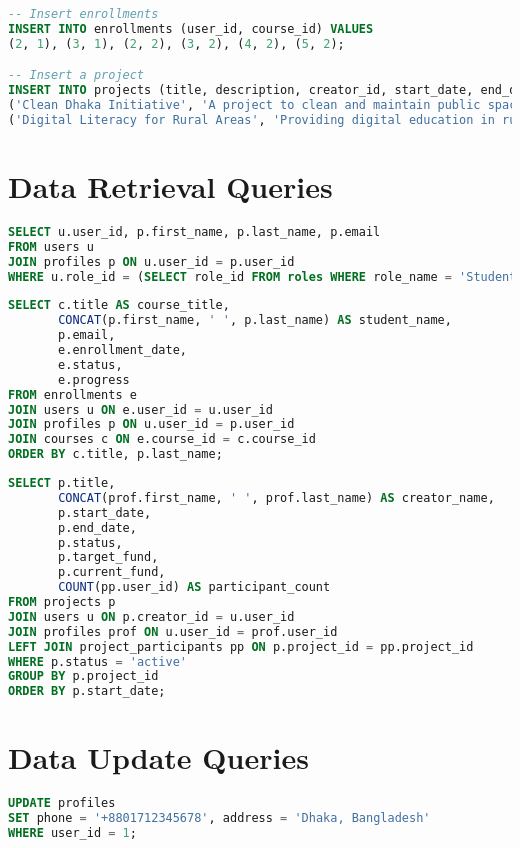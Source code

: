 \documentclass[12pt]{report}
\begin{document}
\begin{lstlisting}[language=SQL, caption=Inserting Sample Data]
-- Insert enrollments
INSERT INTO enrollments (user_id, course_id) VALUES
(2, 1), (3, 1), (2, 2), (3, 2), (4, 2), (5, 2);

-- Insert a project
INSERT INTO projects (title, description, creator_id, start_date, end_date, target_fund) VALUES
('Clean Dhaka Initiative', 'A project to clean and maintain public spaces in Dhaka', 4, '2023-11-01', '2024-06-30', 500000.00),
('Digital Literacy for Rural Areas', 'Providing digital education in rural communities', 5, '2023-12-01', '2024-08-31', 750000.00);
    \end{lstlisting}
    
    \section{Data Retrieval Queries}
    \begin{lstlisting}[language=SQL, caption=Query to Get All Students]
SELECT u.user_id, p.first_name, p.last_name, p.email
FROM users u
JOIN profiles p ON u.user_id = p.user_id
WHERE u.role_id = (SELECT role_id FROM roles WHERE role_name = 'Student');
    \end{lstlisting}
    
    \begin{lstlisting}[language=SQL, caption=Query to Get Course Enrollments]
SELECT c.title AS course_title, 
       CONCAT(p.first_name, ' ', p.last_name) AS student_name, 
       p.email, 
       e.enrollment_date, 
       e.status,
       e.progress
FROM enrollments e
JOIN users u ON e.user_id = u.user_id
JOIN profiles p ON u.user_id = p.user_id
JOIN courses c ON e.course_id = c.course_id
ORDER BY c.title, p.last_name;
    \end{lstlisting}
    
    \begin{lstlisting}[language=SQL, caption=Query to Get Active Projects with Participation Count]
SELECT p.title, 
       CONCAT(prof.first_name, ' ', prof.last_name) AS creator_name,
       p.start_date, 
       p.end_date, 
       p.status,
       p.target_fund,
       p.current_fund,
       COUNT(pp.user_id) AS participant_count
FROM projects p
JOIN users u ON p.creator_id = u.user_id
JOIN profiles prof ON u.user_id = prof.user_id
LEFT JOIN project_participants pp ON p.project_id = pp.project_id
WHERE p.status = 'active'
GROUP BY p.project_id
ORDER BY p.start_date;
    \end{lstlisting}
    
    \section{Data Update Queries}
    \begin{lstlisting}[language=SQL, caption=Update User Profile]
UPDATE profiles 
SET phone = '+8801712345678', address = 'Dhaka, Bangladesh'
WHERE user_id = 1;
    \end{lstlisting}
    
\end{document}
